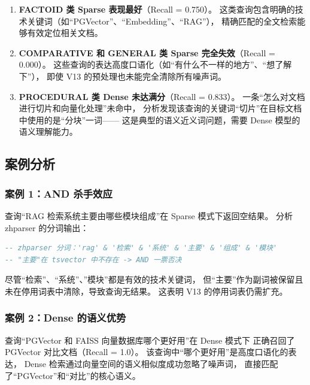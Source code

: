 \documentclass[a4paper, 12pt]{ctexart}
\begin{document}
\begin{enumerate}
  \item \textbf{FACTOID 类 Sparse 表现最好}（Recall = 0.750）。
  这类查询包含明确的技术关键词（如``PGVector''、``Embedding''、``RAG''），
  精确匹配的全文检索能够有效定位相关文档。

  \item \textbf{COMPARATIVE 和 GENERAL 类 Sparse 完全失效}（Recall = 0.000）。
  这些查询的表达高度口语化（如``有什么不一样的地方''、``想了解下''），
  即使 V13 的预处理也未能完全清除所有噪声词。

  \item \textbf{PROCEDURAL 类 Dense 未达满分}（Recall = 0.833）。
  一条``怎么对文档进行切片和向量化处理''未命中，
  分析发现该查询的关键词``切片''在目标文档中使用的是``分块''一词——
  这是典型的语义近义词问题，需要 Dense 模型的语义理解能力。
\end{enumerate}

\subsection{案例分析}

\subsubsection{案例 1：AND 杀手效应}

查询``RAG 检索系统主要由哪些模块组成''在 Sparse 模式下返回空结果。
分析 zhparser 的分词输出：

\begin{lstlisting}[language=SQL]
-- zhparser 分词：'rag' & '检索' & '系统' & '主要' & '组成' & '模块'
-- "主要"在 tsvector 中不存在 -> AND 一票否决
\end{lstlisting}

尽管``检索''、``系统''、''模块''都是有效的技术关键词，
但``主要''作为副词被保留且未在停用词表中清除，导致查询无结果。
这表明 V13 的停用词表仍需扩充。

\subsubsection{案例 2：Dense 的语义优势}

查询``PGVector 和 FAISS 向量数据库哪个更好用''在 Dense 模式下
正确召回了 PGVector 对比文档（Recall = 1.0）。
该查询中``哪个更好用''是高度口语化的表达，
Dense 检索通过向量空间的语义相似度成功忽略了噪声词，
直接匹配了``PGVector''和``对比''的核心语义。

\end{document}
